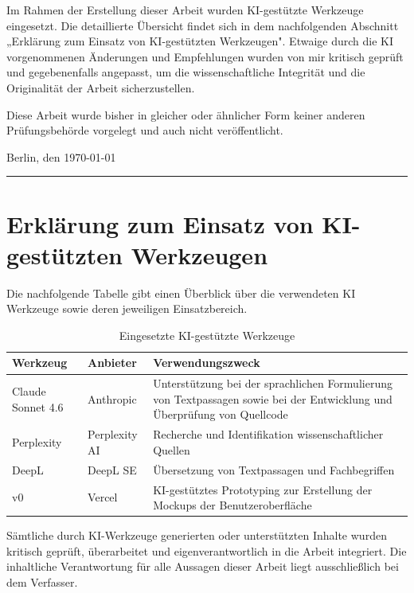 Im Rahmen der Erstellung dieser Arbeit wurden KI-gestützte Werkzeuge eingesetzt. Die detaillierte Übersicht findet sich in dem nachfolgenden Abschnitt „Erklärung zum Einsatz von KI-gestützten Werkzeugen". Etwaige durch die KI vorgenommenen Änderungen und Empfehlungen wurden von mir kritisch geprüft und gegebenenfalls angepasst, um die wissenschaftliche Integrität und die Originalität der Arbeit sicherzustellen.

Diese Arbeit wurde bisher in gleicher oder ähnlicher Form keiner anderen  Prüfungsbehörde vorgelegt und auch nicht veröffentlicht.

\bigskip
Berlin, den {\today}

\bigskip
\bigskip
\noindent\rule{6cm}{0.4pt}

\addtocounter{page}{-1}
\cleardoublepage

\section*{Erklärung zum Einsatz von KI-gestützten Werkzeugen}

Die nachfolgende Tabelle gibt einen Überblick über die verwendeten KI Werkzeuge sowie deren jeweiligen Einsatzbereich.

\begin{table}[htbp]
    \centering
  \begin{tabular}{p{3.5cm} p{3.5cm} p{5cm}}
    \toprule
    \textbf{Werkzeug} & \textbf{Anbieter} & \textbf{Verwendungszweck} \\
    \midrule
    Claude Sonnet 4.6 & Anthropic & Unterstützung bei der sprachlichen
                                   Formulierung von Textpassagen sowie bei der Entwicklung und Überprüfung von Quellcode \\
    \addlinespace
    Perplexity       & Perplexity AI & Recherche und Identifikation
                                       wissenschaftlicher Quellen \\
    \addlinespace
    DeepL             & DeepL SE & Übersetzung von Textpassagen und
                                   Fachbegriffen \\
                                   \addlinespace
    v0               & Vercel & KI-gestütztes Prototyping zur Erstellung 
                             der Mockups der Benutzeroberfläche \\
    \bottomrule
  \end{tabular}
  \caption{Eingesetzte KI-gestützte Werkzeuge}
  \label{tab:ki-werkzeuge}
\end{table}

Sämtliche durch KI-Werkzeuge generierten oder unterstützten Inhalte wurden
kritisch geprüft, überarbeitet und eigenverantwortlich in die Arbeit integriert.
Die inhaltliche Verantwortung für alle Aussagen dieser Arbeit liegt
ausschließlich bei dem Verfasser.

\cleardoublepage











